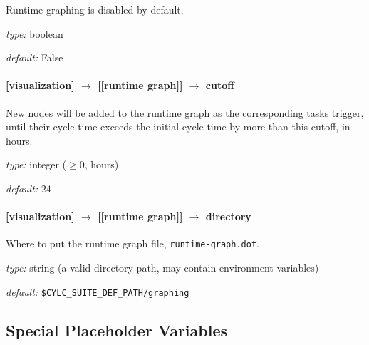 Runtime graphing is disabled by default.
\begin{myitemize}
    \item {\em type:} boolean
    \item {\em default:} False
\end{myitemize}

\paragraph[cutoff]{[visualization] $\rightarrow$ [[runtime graph]] $\rightarrow$ cutoff}

New nodes will be added to the runtime graph as the corresponding tasks
trigger, until their cycle time exceeds the initial cycle time by more
than this cutoff, in hours.

\begin{myitemize}
    \item {\em type:} integer ($\geq 0$, hours)
    \item {\em default:} $24$
\end{myitemize}

\paragraph[directory]{[visualization] $\rightarrow$ [[runtime graph]] $\rightarrow$ directory}

Where to put the runtime graph file, \lstinline=runtime-graph.dot=.

\begin{myitemize}
    \item {\em type:} string (a valid directory path, may contain environment variables)
    \item {\em default:} \lstinline=$CYLC_SUITE_DEF_PATH/graphing=
\end{myitemize}


\subsection{Special Placeholder Variables}

